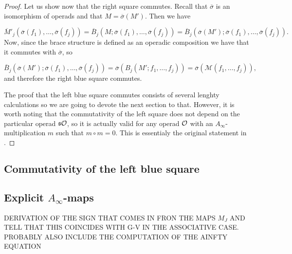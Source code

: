 \documentclass[twoside]{article}
\begin{document}
\begin{proof}
 Let us show now that the right square commutes. Recall that $\overline{\sigma}$ is an isomorphism of operads and that $M=\overline{\sigma}(M')$. Then we have 
 
 \[\overline{M}'_j(\overline{\sigma}(f_1),\dots,\overline{\sigma}(f_j))=\overline{B}_j(M;\overline{\sigma}(f_1),\dots,\overline{\sigma}(f_j))=\overline{B}_j(\overline{\sigma}(M');\overline{\sigma}(f_1),\dots,\overline{\sigma}(f_j)).\]
 Now, since the brace structure is defined as an operadic composition we have that it commutes with $\overline{\sigma}$, so
 
 \[\overline{B}_j(\overline{\sigma}(M');\overline{\sigma}(f_1),\dots,\overline{\sigma}(f_j))=\overline{\sigma}(B_j(M';f_1,\dots, f_j))=\overline{\sigma}(\mathcal{M}(f_1,\dots, f_j)),\]
 and therefore the right blue square commutes.
 
 The proof that the left blue square commutes consists of several lenghty calculations so we are going to devote the next section to that. However, it is worth noting that the commutativity of the left square does not depend on the particular operad $\mathfrak{s}{\mathcal O}$, so it is actually valid for any operad ${\mathcal O}$ with an $A_\infty$-multiplication $m$ such that $m\circ m=0$. This is essentialy the original statement in \cite{GV}.
\end{proof}


\subsection{Commutativity of the left blue square}



\begin{appendices}
\appendix
\gdef\thesection{Appendix \Alph{section}}
\section{Explicit $A_\infty$-maps}
DERIVATION OF THE SIGN THAT COMES IN FRON THE MAPS $M_J$ AND TELL THAT THIS COINCIDES WITH G-V IN THE ASSOCIATIVE CASE. PROBABLY ALSO INCLUDE THE COMPUTATION OF THE AINFTY EQUATION


%
\end{appendices}


\end{document}
